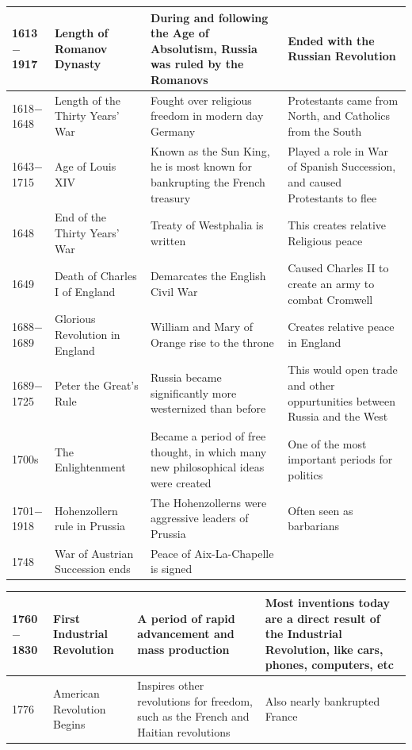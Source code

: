 \documentclass[12pt]{article}
\begin{document}
\begin{enumerate}
\begin{tabular}{|p{}|p{}|p{}|p{}|}
\hline
1613$-$1917 & Length of Romanov Dynasty  & During and following the Age of Absolutism, Russia was ruled by the Romanovs  & Ended with the Russian Revolution  \\
\hline
1618$-$1648 & Length of the Thirty Years' War  & Fought over religious freedom in modern day Germany  & Protestants came from North, and Catholics from the South  \\
\hline
1643$-$1715 & Age of Louis XIV  & Known as the Sun King, he is most known for bankrupting the French treasury & Played a role in War of Spanish Succession, and caused Protestants to flee \\
\hline
1648 & End of the Thirty Years' War & Treaty of Westphalia is written & This creates relative Religious peace \\
\hline
1649 & Death of Charles I of England & Demarcates the English Civil War  & Caused Charles II to create an army to combat Cromwell \\
\hline
1688$-$1689 & Glorious Revolution in England & William and Mary of Orange rise to the throne & Creates relative peace in England \\
\hline
1689$-$1725 & Peter the Great's Rule & Russia became significantly more westernized than before  & This would open trade and other oppurtunities between Russia and the West  \\
\hline
1700s & The Enlightenment  & Became a period of free thought, in which many new philosophical ideas were created  & One of the most important periods for politics  \\
\hline
1701$-$1918 & Hohenzollern rule in Prussia & The Hohenzollerns were aggressive leaders of Prussia  & Often seen as barbarians \\
\hline
1748 & War of Austrian Succession ends  & Peace of Aix-La-Chapelle is signed  & \\
\hline
\end{tabular}
\newpage
\hspace{-25pt}\begin{tabular}{|p{}|p{}|p{}|p{}|}
\hline
1760$-$1830 & First Industrial Revolution  & A period of rapid advancement and mass production  & Most inventions today are a direct result of the Industrial Revolution, like cars, phones, computers, etc  \\
\hline
1776 & American Revolution Begins & Inspires other revolutions for freedom, such as the French and Haitian revolutions  & Also nearly bankrupted France \\

\end{tabular}
\end{enumerate}
\end{document}
